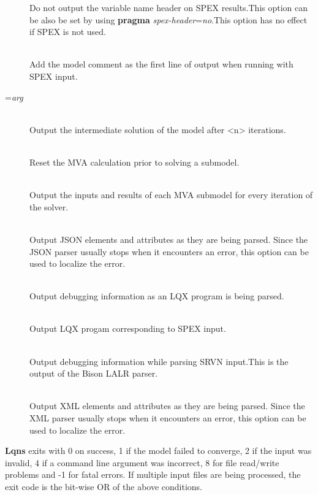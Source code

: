 \begin{description}
Do not output the variable name header on SPEX results.This option can be also be set by using \textbf{pragma} \emph{spex-header}=\emph{no}.This option has no effect if SPEX is not used.
\item[\longopt{print-comment}]~\\
Add the model comment as the first line of output when running with SPEX input.
\item[\longopt{print-interval}=\emph{arg}]~\\
Output the intermediate solution of the model after <n> iterations.
\item[\longopt{reset-mva}]~\\
Reset the MVA calculation prior to solving a submodel.
\item[\longopt{trace-mva}]~\\
Output the inputs and results of each MVA submodel for every iteration of the solver.
\item[\longopt{debug-json}]~\\
Output JSON elements and attributes as they are being parsed.   Since the JSON parser usually stops when it encounters an error,
this option can be used to localize the error.
\item[\longopt{debug-lqx}]~\\
Output debugging information as an LQX program is being parsed.
\item[\longopt{debug-spex}]~\\
Output LQX progam corresponding to SPEX input.
\item[\longopt{debug-srvn}]~\\
Output debugging information while parsing SRVN input.This is the output of the Bison LALR parser.
\item[\longopt{debug-xml}]~\\
Output XML elements and attributes as they are being parsed.
Since the XML parser usually stops when it encounters an error,
this option can be used to localize the error.
\end{description}


\textbf{Lqns} exits with 0 on success, 1 if the model failed to converge,
2 if the input was invalid, 4 if a command line argument was
incorrect, 8 for file read/write problems and -1 for fatal errors.  If
multiple input files are being processed, the exit code is the
bit-wise OR of the above conditions.
